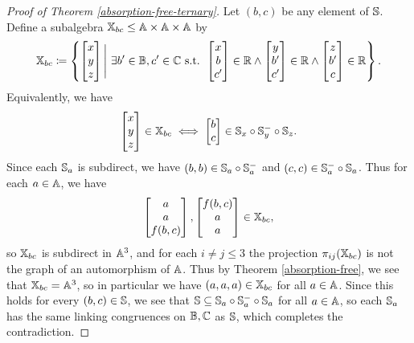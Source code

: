 \documentclass[letterpaper,11pt]{article}
\begin{document}
\begin{proof}[Proof of Theorem \ref{absorption-free-ternary}]
Let $(b,c)$ be any element of $\mathbb{S}$. Define a subalgebra $\mathbb{X}_{bc} \le \mathbb{A}\times \mathbb{A}\times \mathbb{A}$ by
\[
\mathbb{X}_{bc} \coloneqq \left\{\begin{bmatrix}x\\y\\z\end{bmatrix} \Bigg|\ \exists b' \in \mathbb{B}, c' \in \mathbb{C}\text{ s.t. }\begin{bmatrix}x\\b\\c'\end{bmatrix} \in \mathbb{R} \wedge \begin{bmatrix}y\\b'\\c'\end{bmatrix} \in \mathbb{R} \wedge \begin{bmatrix}z\\b'\\c\end{bmatrix} \in \mathbb{R}\right\}.
\]
Equivalently, we have
\[
\begin{bmatrix}x\\y\\z\end{bmatrix} \in \mathbb{X}_{bc} \iff \begin{bmatrix}b\\c\end{bmatrix} \in \mathbb{S}_x \circ \mathbb{S}_y^- \circ \mathbb{S}_z.
\]
Since each $\mathbb{S}_a$ is subdirect, we have $(b,b) \in \mathbb{S}_a\circ \mathbb{S}_a^-$ and $(c,c) \in \mathbb{S}_a^- \circ \mathbb{S}_a$. Thus for each $a \in \mathbb{A}$, we have
\[
\begin{bmatrix}a\\a\\f(b,c)\end{bmatrix}, \begin{bmatrix}f(b,c)\\a\\a\end{bmatrix} \in \mathbb{X}_{bc},
\]
so $\mathbb{X}_{bc}$ is subdirect in $\mathbb{A}^3$, and for each $i \ne j \le 3$ the projection $\pi_{ij}(\mathbb{X}_{bc})$ is not the graph of an automorphism of $\mathbb{A}$. Thus by Theorem \ref{absorption-free}, we see that $\mathbb{X}_{bc} = \mathbb{A}^3$, so in particular we have $(a,a,a) \in \mathbb{X}_{bc}$ for all $a \in \mathbb{A}$. Since this holds for every $(b,c) \in \mathbb{S}$, we see that $\mathbb{S} \subseteq \mathbb{S}_a\circ \mathbb{S}_a^{-} \circ \mathbb{S}_a$ for all $a \in \mathbb{A}$, so each $\mathbb{S}_a$ has the same linking congruences on $\mathbb{B},\mathbb{C}$ as $\mathbb{S}$, which completes the contradiction.
\end{proof}
\end{document}
